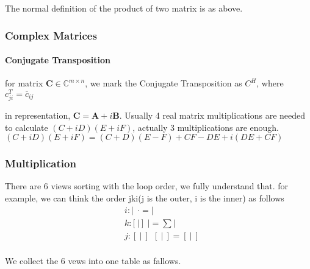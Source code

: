 \documentclass[UTF8]{../../09-Mathematics}
\begin{document}
The normal definition of the product of two matrix is as above. 

\subsubsection{Complex Matrices}

\paragraph{Conjugate Transposition}

for matrix $ \boldsymbol  C \in \mathbb{C}^{m \times n}$, we mark the Conjugate Transposition as $C^H$,
where $c^T_{ji} = \overline{c}_{ij}$

in representation, $ \boldsymbol  C = \boldsymbol A + i \boldsymbol B$. Usually 4 real matrix multiplications are needed to calculate $(C+iD)(E+ i F)$, actually 3  multiplications  are enough. $(C+iD)(E+ i F) =  (C+D)(E-F)+CF-DE + i(DE+CF)$



\subsubsection{Multiplication}


There are 6 views sorting with the loop order, we fully understand that. for example, we can think the order jki(j is the outer, i is the inner) as follows
\begin{equation}
    \begin{split}
    &i: | \ \ \cdot = | \\
    &k: [\ | \ ]  \ \ | =  \sum|  \\
    &j:  [\ | \ ]  \ \  [\ | \ ]=  [\ | \ ]\\
\end{split}
\end{equation}


We collect the 6 vews into one table as fallows.
\end{document}
